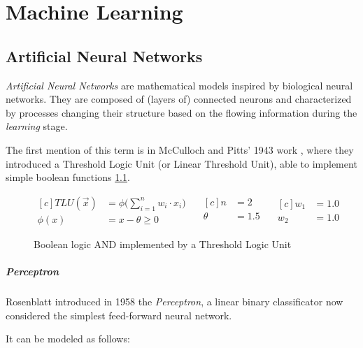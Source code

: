 \chapter{Machine Learning}

\section{Artificial Neural Networks}

\textit{Artificial Neural Networks} are mathematical models inspired by biological neural networks. They are composed of (layers of) connected neurons and characterized by processes changing their structure based on the flowing information during the \textit{learning} stage.

The first mention of this term is in McCulloch and Pitts' 1943 work \cite{McCulloch1943}, where they introduced a Threshold Logic Unit (or Linear Threshold Unit), able to implement simple boolean functions \ref{fig:TLU}.

\begin{figure}[H]
	\centering
	\begin{equation*}
		\begin{aligned}[c]
			TLU(\vec{x}) & = \phi \bigg( \sum_{i=1}^{n}{w_{i} \cdot x_{i}} \bigg) \\
			\phi(x)      & = x - \theta \geq 0
		\end{aligned}
		\quad
		\begin{aligned}[c]
			n      & = 2   \\
			\theta & = 1.5 \\
		\end{aligned}
		\quad
		\begin{aligned}[c]
			w_{1} & = 1.0 \\
			w_{2} & = 1.0
		\end{aligned}
	\end{equation*}
	\caption{Boolean logic AND implemented by a Threshold Logic Unit}
	\label{fig:TLU}
\end{figure}

\paragraph{Perceptron}

Rosenblatt introduced in 1958 the \textit{Perceptron}\cite{rosenblatt1958perceptron}, a linear binary classificator now considered the simplest feed-forward neural network.

It can be modeled as follows:

